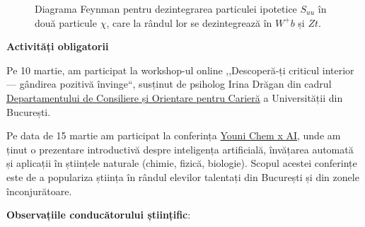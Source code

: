 \begin{figure}
    \centering
    \caption{Diagrama Feynman pentru dezintegrarea particulei ipotetice \(S_{uu}\) în două particule \(\chi\), care la rândul lor se dezintegrează în \(W^+ b\) și \(Z t\).}
    \label{fig:diagram_suu_chi_chi_wb_zt}
\end{figure}


\textbf{Activități obligatorii}

Pe 10 martie, am participat la workshop-ul online ,,Descoperă-ți criticul interior --- gândirea pozitivă învinge``, susținut de psiholog Irina Drăgan din cadrul \href{https://ciocp.unibuc.ro/}{Departamentului de Consiliere și Orientare pentru Carieră} a Universității din București.

Pe data de 15 martie am participat la conferința \href{https://younichemxai.org/}{Youni Chem x AI}, unde am ținut o prezentare introductivă despre inteligența artificială, învățarea automată și aplicații în științele naturale (chimie, fizică, biologie). Scopul acestei conferințe este de a populariza știința în rândul elevilor talentați din București și din zonele înconjurătoare.

\textbf{Observațiile conducătorului științific}:

